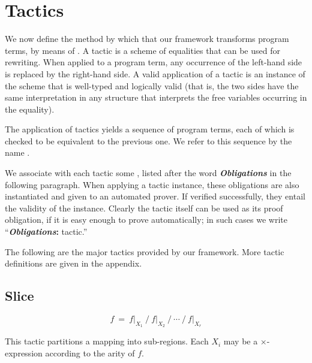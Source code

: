 \section{Tactics}
\label{tactics}

We now define the method by which that our framework transforms program terms, by means of .
A tactic is a scheme of equalities that can be used for rewriting.
When applied to a program term, any occurrence of the left-hand side is replaced by the right-hand side.
A valid application of a tactic is an instance of the scheme that is well-typed and logically valid
(that is, the two sides have the same interpretation in any structure that interprets the free
variables occurring in the equality).

The application of tactics yields a sequence of program terms, each of which is checked to
be equivalent to the previous one. We refer to this sequence by the name .

We associate with each tactic some , listed after the word \textbf{\textit{Obligations}}
in the following paragraph.
When applying a tactic instance, these obligations are also instantiated and given to an automated prover. 
If verified successfully, they entail the validity of the instance. 
Clearly the tactic itself can be used as its proof obligation, if it is easy enough to prove automatically; 
in such cases we write ``\textbf{\textit{Obligations}:} tactic.''

The following are the major tactics provided by our framework. 
More tactic definitions are given in the appendix.

\newcommand\Obligations{\medskip\noindent\textbf{\textit{Obligations}:} }
\newcommand\reduce{\operatorname{reduce}}
\newcommand\listConcat{{\scriptstyle \,++\,}}

\theoremstyle{definition}
\newtheorem{tactic}{Tactic}

\newcommand\tacticdef[1]{\subsection*{\sf\larger #1}\vspace{-3mm}}

\tacticdef{Slice} \label{tactics:Slice}
\[f ~=~ f\big|_{X_1} ~\Big/~ f\big|_{X_2} ~\Big/ ~\cdots~ \Big/~ f\big|_{X_r}\] 

This tactic partitions a mapping into sub-regions. Each $X_i$ may be a $\times$-expression
according to the arity of $f$.

